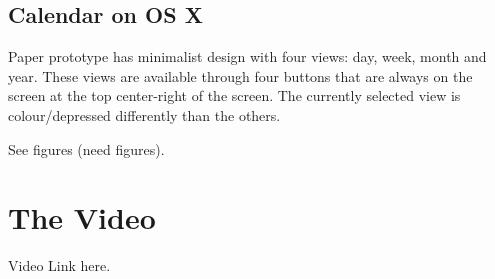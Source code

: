 \documentclass{article}
\begin{document}
\subsection{Calendar on OS X}

Paper prototype has minimalist design with four views: day, week, month
and year. These views are available through four buttons that are
always on the screen at the top center-right of the screen. The
currently selected view is colour/depressed differently than the
others.


See figures (need figures).
\section{The Video}

Video Link here.

\end{document}
